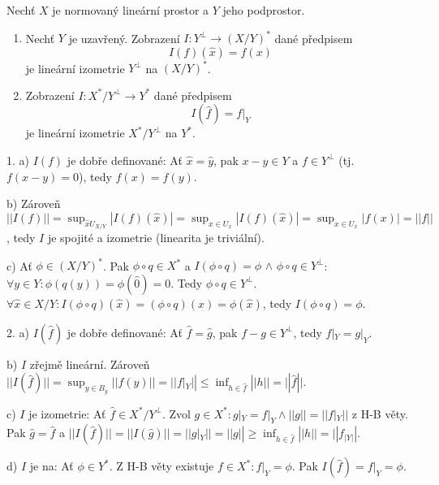 \documentclass[12pt]{article}					%
\begin{document}
\begin{veta}
	Nechť $X$ je normovaný lineární prostor a $Y$ jeho podprostor.

	\begin{enumerate}
		\item Nechť $Y$ je uzavřený. Zobrazení $I: Y^\perp \rightarrow (X / Y)^*$ dané předpisem
			$$ I(f)(\hat{x}) = f(x) $$
			je lineární izometrie $Y^\perp$ na $(X / Y)^*$.

		\item Zobrazení $I: X^* / Y^\perp \rightarrow Y^*$ dané předpisem
			$$ I(\hat{f}) = f|_Y $$
			je lineární izometrie $X^* / Y^\perp$ na $Y^*$.
	\end{enumerate}

	\begin{dukazin}
		1. a) $I(f)$ je dobře definované: Ať $\hat{x} = \hat{y}$, pak $x - y \in Y$ a $f \in Y^\perp$ (tj. $f(x - y) = 0$), tedy $f(x) = f(y)$.

		b) Zároveň $||I(f)|| = \sup_{\hat{x} U_{X / Y}} |I(f)(\hat{x})| = \sup_{x \in U_x} |I(f)(\hat{x})| = \sup_{x \in U_x} |f(x)| = ||f||$, tedy $I$ je spojité a izometrie (linearita je triviální).

		c) Ať $\phi \in (X / Y)^*$. Pak $\phi \circ q \in X^*$ a $I(\phi \circ q) = \phi$ $\land$ $\phi \circ q \in Y^\perp$: $\forall y \in Y: \phi(q(y)) = \phi(\hat{0}) = 0$. Tedy $\phi \circ q \in Y^\perp$. $\forall \hat{x} \in X / Y: I(\phi\circ q)(\hat{x}) = (\phi \circ q)(x) = \phi(\hat{x})$, tedy $I(\phi \circ q) = \phi$.

		2. a) $I(\hat{f})$ je dobře definované: Ať $\hat{f} = \hat{g}$, pak $f - g \in Y^\perp$, tedy $f|_Y = g|_Y$.

		b) $I$ zřejmě lineární. Zároveň $||I(\hat{f})|| = \sup_{y \in B_y} ||f(y)|| = ||f|_Y|| ≤ \inf_{h \in \hat{f}} ||h|| = ||\hat{f}||$.

		c) $I$ je izometrie: Ať $\hat{f} \in X^* / Y^\perp$. Zvol $g \in X^*: g|_Y = f|_Y \land ||g|| = ||f|_Y||$ z H-B věty. Pak $\hat{g} = \hat{f}$ a $||I(\hat{f})|| = ||I(\hat{g})|| = ||g|_Y|| = ||g|| ≥ \inf_{h \in \hat{f}} ||h|| = ||f_|Y||$.

		d) $I$ je na: Ať $\phi \in Y^*$. Z H-B věty existuje $f \in X^*: f|_Y = \phi$. Pak $I(\hat{f}) = f|_Y = \phi$.
	\end{dukazin}
\end{veta}
\end{document}
